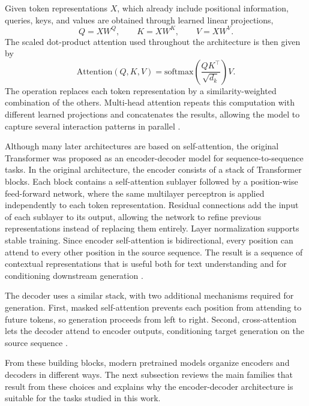 Given token representations $X$, which already include positional information,
queries, keys, and values are obtained through learned linear projections,
\begin{equation}
Q = XW^Q, \qquad K = XW^K, \qquad V = XW^V.
\end{equation}
The scaled dot-product attention used throughout the architecture is then given
by
\begin{equation}
\mathrm{Attention}(Q, K, V) =
\mathrm{softmax}\left(\frac{QK^\top}{\sqrt{d_k}}\right)V.
\end{equation}
The operation replaces each token representation by a similarity-weighted
combination of the others. Multi-head attention repeats this computation with
different learned projections and concatenates the results,
allowing the model to capture several interaction patterns in parallel
\citep{NIPS2017_3f5ee243}.

Although many later architectures are based on self-attention, the original
Transformer was proposed as an encoder-decoder model for sequence-to-sequence
tasks. In the original architecture, the encoder consists of a stack of Transformer
blocks. Each block contains a
self-attention sublayer followed by a position-wise feed-forward network, where
the same multilayer perceptron is applied independently to each token
representation. Residual connections add the input of each sublayer to its
output, allowing the network to refine previous representations instead of
replacing them entirely. Layer normalization supports stable training. Since
encoder self-attention is bidirectional, every position can attend to every
other position in the source sequence. The result is a sequence of contextual
representations that is useful both for text understanding and for conditioning
downstream generation \citep{NIPS2017_3f5ee243}.

The decoder uses a similar stack, with two additional mechanisms required for
generation. First, masked self-attention prevents each position from attending
to future tokens, so generation proceeds from left to right. Second,
cross-attention lets the decoder attend to encoder outputs, conditioning target
generation on the source sequence \citep{NIPS2017_3f5ee243}.

From these building blocks, modern pretrained models organize encoders and
decoders in different ways. The next subsection reviews the main families that
result from these choices and explains why the encoder-decoder architecture is
suitable for the tasks studied in this work.


